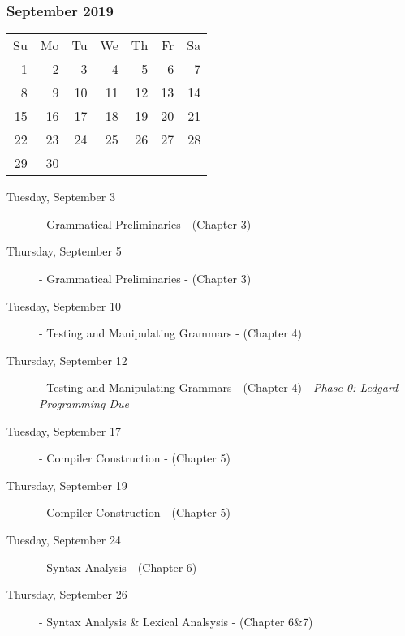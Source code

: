 \subsubsection*{September 2019}
\begin{tabular}{rrrrrrr}
Su & Mo & Tu & We & Th & Fr & Sa\\
 1 &  2 &  3 &  4 &  5 &  6 & 7\\
 8 &  9 & 10 & 11 & 12 & 13 & 14\\
15 & 16 & 17 & 18 & 19 & 20 & 21\\
22 & 23 & 24 & 25 & 26 & 27 & 28\\
29 & 30 &    &    &    &    &   \\
\end{tabular}
\begin{description}
\item[Tuesday, September 3]
  - Grammatical Preliminaries
  \newline - (Chapter 3)
\item[Thursday, September 5]
  - Grammatical Preliminaries
  \newline - (Chapter 3)

\item[Tuesday, September 10]
  - Testing and Manipulating Grammars
  \newline - (Chapter 4)
\item[Thursday, September 12]
  - Testing and Manipulating Grammars
  \newline - (Chapter 4)
  \newline - {\em Phase 0: Ledgard Programming Due}

\item[Tuesday, September 17]
  - Compiler Construction
  \newline - (Chapter 5)
\item[Thursday, September 19]
  - Compiler Construction
  \newline - (Chapter 5)

\item[Tuesday, September 24]
  - Syntax Analysis
  \newline - (Chapter 6)
\item[Thursday, September 26]
  - Syntax Analysis \& Lexical Analsysis
  \newline - (Chapter 6\&7)
\end{description}

\hrulefill


